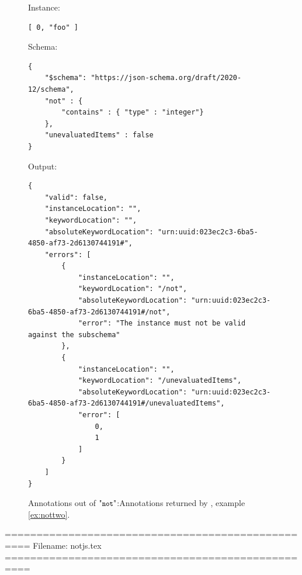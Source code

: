 \begin{figure}
\small

Instance:
\begin{querybox}{}
\begin{lstlisting}[style=querynonumbers]
[ 0, "foo" ]
\end{lstlisting}
\end{querybox}


Schema:
\begin{querybox}{}
\begin{lstlisting}[style=query]
{
	"$schema": "https://json-schema.org/draft/2020-12/schema",
	"not" : {
	    "contains" : { "type" : "integer"}
	},
	"unevaluatedItems" : false
}
\end{lstlisting}
\end{querybox}
 
Output:
\begin{querybox}{}
\begin{lstlisting}[style=query]
{
    "valid": false,
    "instanceLocation": "",
    "keywordLocation": "",
    "absoluteKeywordLocation": "urn:uuid:023ec2c3-6ba5-4850-af73-2d6130744191#",
    "errors": [
        {
            "instanceLocation": "",
            "keywordLocation": "/not",
            "absoluteKeywordLocation": "urn:uuid:023ec2c3-6ba5-4850-af73-2d6130744191#/not",
            "error": "The instance must not be valid against the subschema"
        },
        {
            "instanceLocation": "",
            "keywordLocation": "/unevaluatedItems",
            "absoluteKeywordLocation": "urn:uuid:023ec2c3-6ba5-4850-af73-2d6130744191#/unevaluatedItems",
            "error": [
                0,
                1
            ]
        }
    ]
}
\end{lstlisting}
\end{querybox}

\caption{Annotations out of $\qnot$:Annotations returned by {\JS}, example \ref{ex:nottwo}.}
\label{fig:notjs}
\end{figure}



==================================================
Filename: notjs.tex
==================================================

